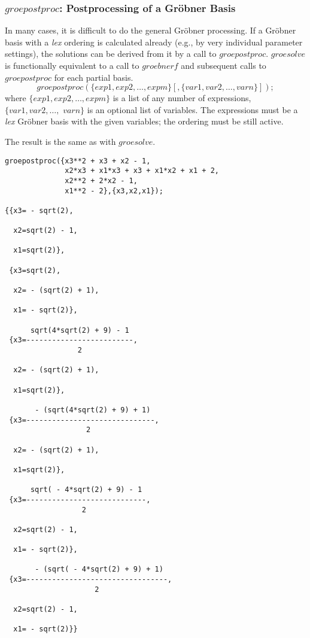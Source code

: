 \subsubsection{$groepostproc$: Postprocessing of a Gr\"obner Basis}
In many cases, it is difficult to do the general Gr\"obner processing.
If a Gr\"obner basis with a {\it lex} ordering is calculated already (e.g.,
by very individual parameter settings), the solutions can be derived
from it by a call to $groepostproc$. $groesolve$ is functionally
equivalent to a call to $groebnerf$ and subsequent calls to
$groepostproc$ for each partial basis.
\[
 groepostproc(\{exp1, exp2, \ldots , expm\}[,\{var1, var2, \ldots ,
varn\}]);
\]
where $\{exp1, exp2, \ldots , expm\}$ is a list of any number of
expressions, \linebreak[4] $\{var1, var2, \ldots ,$ $ varn\}$ is an
optional list of variables. The expressions must be a {\it lex} Gr\"obner
basis with the given variables; the ordering must be still active.

The result is the same as with $groesolve$.

\begin{verbatim}
groepostproc({x3**2 + x3 + x2 - 1,
              x2*x3 + x1*x3 + x3 + x1*x2 + x1 + 2,
              x2**2 + 2*x2 - 1,
              x1**2 - 2},{x3,x2,x1});

{{x3= - sqrt(2),

  x2=sqrt(2) - 1,

  x1=sqrt(2)},

 {x3=sqrt(2),

  x2= - (sqrt(2) + 1),

  x1= - sqrt(2)},

      sqrt(4*sqrt(2) + 9) - 1
 {x3=-------------------------,
                 2

  x2= - (sqrt(2) + 1),

  x1=sqrt(2)},

       - (sqrt(4*sqrt(2) + 9) + 1)
 {x3=------------------------------,
                   2

  x2= - (sqrt(2) + 1),

  x1=sqrt(2)},

      sqrt( - 4*sqrt(2) + 9) - 1
 {x3=----------------------------,
                  2

  x2=sqrt(2) - 1,

  x1= - sqrt(2)},

       - (sqrt( - 4*sqrt(2) + 9) + 1)
 {x3=---------------------------------,
                     2

  x2=sqrt(2) - 1,

  x1= - sqrt(2)}}
\end{verbatim}

